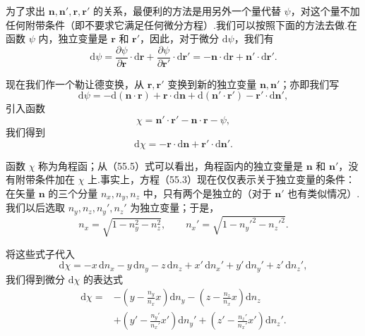 为了求出 $\boldsymbol{n},\boldsymbol{n}',\boldsymbol{r},\boldsymbol{r}'$ 的关系，最便利的方法是用另外一个量代替 $\psi$，对这个量不加任何附带条件（即不要求它满足任何微分方程）.我们可以按照下面的方法去做.在函数 $\psi$ 内，独立变量是 $\boldsymbol{r}$ 和 $\boldsymbol{r}'$，因此，对于微分 $\mathrm{d}\psi$，我们有
\begin{equation*}
  \mathrm{d}\psi=\frac{\partial\psi}{\partial\boldsymbol{r}}\cdot\mathrm{d}\boldsymbol{r}
  +\frac{\partial\psi}{\partial\boldsymbol{r}'}\cdot\mathrm{d}\boldsymbol{r}'
  =-\boldsymbol{n}\cdot\mathrm{d}\boldsymbol{r}
  +\boldsymbol{n}'\cdot\mathrm{d}\boldsymbol{r}'.
\end{equation*}

现在我们作一个勒让德变换，从 $\boldsymbol{r},\boldsymbol{r}'$ 变换到新的独立变量 $\boldsymbol{n},\boldsymbol{n}'$；亦即我们写
\begin{equation*}
  \mathrm{d}\psi=-\mathrm{d}(\boldsymbol{n}\cdot\boldsymbol{r})
  +\boldsymbol{r}\cdot\mathrm{d}\boldsymbol{n}
  +\mathrm{d}(\boldsymbol{n}'\cdot\boldsymbol{r}')
  -\boldsymbol{r}'\cdot\mathrm{d}\boldsymbol{n}',
\end{equation*}
引入函数
\begin{equation}
  \chi=\boldsymbol{n}'\cdot\boldsymbol{r}'-\boldsymbol{n}\cdot\boldsymbol{r}-\psi,
\end{equation}
我们得到
\begin{equation}
  \mathrm{d}\chi=-\boldsymbol{r}\cdot\mathrm{d}\boldsymbol{n}
  +\boldsymbol{r}'\cdot\mathrm{d}\boldsymbol{n}'.
\end{equation}

函数 $\chi$ 称为角程函；从（55.5）式可以看出，角程函内的独立变量是 $\boldsymbol{n}$ 和 $\boldsymbol{n}'$，没有附带条件加在 $\chi$ 上.事实上，方程（55.3）现在仅仅表示关于独立变量的条件：在矢量 $\boldsymbol{n}$ 的三个分量 $n_x,n_y,n_z$ 中，只有两个是独立的（对于 $\boldsymbol{n}'$ 也有类似情况）.我们以后选取 $n_y,n_z,n_y',n_z'$ 为独立变量；于是，
\begin{equation*}
  n_x=\sqrt{1-n_y^2-n_z^2},\qquad
  n_x'=\sqrt{1-n_y'^2-n_z'^2}.
\end{equation*}

将这些式子代入
\begin{equation*}
  \mathrm{d}\chi=-x\,\mathrm{d}n_x-y\,\mathrm{d}n_y-z\,\mathrm{d}n_z
  +x'\,\mathrm{d}n_x'+y'\,\mathrm{d}n_y'+z'\,\mathrm{d}n_z',
\end{equation*}
我们得到微分 $\mathrm{d}\chi$ 的表达式
\begin{equation*}
\begin{aligned}
  \mathrm{d}\chi={}&-\left(y-\frac{n_y}{n_x}x\right)\mathrm{d}n_y
  -\left(z-\frac{n_z}{n_x}x\right)\mathrm{d}n_z\\
  &+\left(y'-\frac{n_y'}{n_x'}x'\right)\mathrm{d}n_y'
  +\left(z'-\frac{n_z'}{n_x'}x'\right)\mathrm{d}n_z'.
\end{aligned}
\end{equation*}


